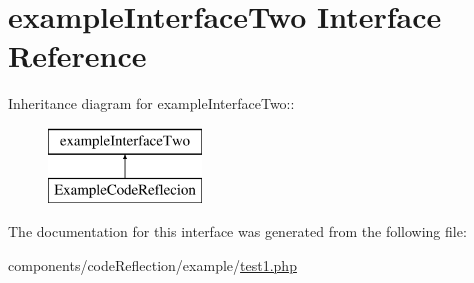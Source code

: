 \hypertarget{interfaceexample_interface_two}{
\section{exampleInterfaceTwo Interface Reference}
\label{interfaceexample_interface_two}
}
Inheritance diagram for exampleInterfaceTwo::\begin{figure}[H]
\begin{center}
\leavevmode
\includegraphics[height=2cm]{interfaceexample_interface_two}
\end{center}
\end{figure}


The documentation for this interface was generated from the following file:\begin{CompactItemize}
\item 
components/codeReflection/example/\hyperlink{code_reflection_2example_2test1_8php}{test1.php}\end{CompactItemize}
